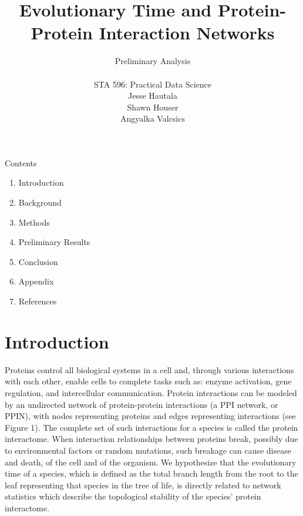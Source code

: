 \documentclass[12pt]{article}
\begin{document}
\title{\textbf{Evolutionary Time and Protein-Protein Interaction Networks}}
\author{Preliminary Analysis \\ \\ STA 596: Practical Data Science \\ Jesse Hautala \\ Shawn Houser \\ Angyalka Valcsics }

	\maketitle
\onehalfspacing

\noindent Contents
\begin{enumerate}[label = \Roman{*}.]
\item Introduction
\item Background
\item Methods
\item Preliminary Results
\item Conclusion
\item Appendix
\item References \newline
\end{enumerate}

\section{Introduction}
Proteins control all biological systems in a cell and, through various interactions with each other, enable cells to complete tasks such as: enzyme activation, gene regulation, and intercellular communication. Protein interactions can be modeled by an undirected network of protein-protein interactions (a PPI network, or PPIN), with nodes representing proteins and edges representing interactions (see Figure 1). The complete set of such interactions for a species is called the protein interactome. When interaction relationships between proteins break, possibly due to environmental factors or random mutations, such breakage can cause disease and death, of the cell and of the organism. We hypothesize that the evolutionary time of a species, which is defined as the total branch length from the root to the leaf representing that species in the tree of life, is directly related to network statistics which describe the topological stability of the species’ protein interactome.
\end{document}
